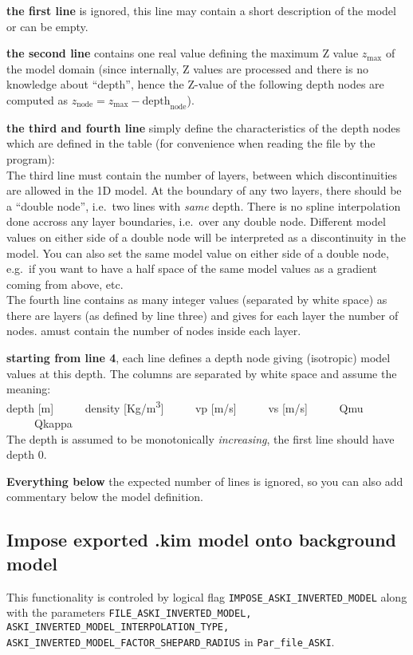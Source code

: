 \documentclass[12pt,a4paper]{article}
\newcommand{\lcode}[1]{\nolinkurl{#1}}
\newcommand{\lcodetitle}[1]{ {\ttfamily #1} }
\begin{document}
{\bf the first line} is ignored, this line may contain a short description of the model or can be empty.

{\bf the second line} contains one real value defining the maximum Z value $z_\text{max}$ of the model domain
(since internally, Z values are processed and there is no knowledge about ``depth'', hence the Z-value 
of the following depth nodes are computed as $z_\text{node} = z_\text{max} - \text{depth}_\text{node}$).

{\bf the third and fourth line} simply define the characteristics of the depth nodes which are defined 
in the table (for convenience when reading the file by the program):\\
The third line must contain the number of layers, between which discontinuities are allowed in the 1D model. 
At the boundary of any two layers, there should be a ``double node'', i.e.\ two lines with \emph{same} depth. 
There is no spline interpolation done accross any layer boundaries, i.e.\ over any double node. 
Different model values on either side of a double node will be interpreted as a discontinuity in the model. 
You can also set the same model value on either side of a double node, e.g.\ if you want to have a half space
of the same model values as a gradient coming from above, etc.\\
The fourth line contains as many integer values (separated by white space) as there are layers 
(as defined by line three) and gives for each layer the number of nodes. 
amust contain the number of nodes inside each layer. 

{\bf starting from line 4}, each line defines a depth node giving (isotropic) model values at this depth.
The columns are separated by white space and assume the meaning:\\
depth [m] \ \ \ \ \ density [Kg/m\textsuperscript{3}] \ \ \ \ \ vp [m/s] \ \ \ \ \ vs [m/s] \ \ \ \ \ Qmu \ \ \ \ \ Qkappa\\
The depth is assumed to be monotonically \emph{increasing}, the first line should have depth 0. 

{\bf Everything below} the expected number of lines is ignored, so you can also add commentary below the
model definition.

\subsection{Impose exported \lcodetitle{.kim} model onto background model} \label{import_model:ssec_kim_export}
This functionality is controled by logical flag \lcode{IMPOSE_ASKI_INVERTED_MODEL} along with
the parameters \lcode{FILE_ASKI_INVERTED_MODEL, ASKI_INVERTED_MODEL_INTERPOLATION_TYPE, 
ASKI_INVERTED_MODEL_FACTOR_SHEPARD_RADIUS} in \lcode{Par_file_ASKI}.
\end{document}
